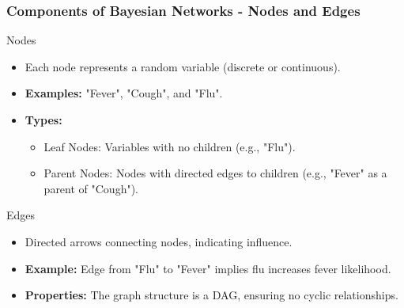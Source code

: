 \documentclass[aspectratio=169]{beamer}
\begin{document}
\begin{frame}[fragile]
    \frametitle{Components of Bayesian Networks - Nodes and Edges}
    \begin{block}{Nodes}
        \begin{itemize}
            \item Each node represents a random variable (discrete or continuous).
            \item \textbf{Examples:} "Fever", "Cough", and "Flu".
            \item \textbf{Types:}
            \begin{itemize}
                \item Leaf Nodes: Variables with no children (e.g., "Flu").
                \item Parent Nodes: Nodes with directed edges to children (e.g., "Fever" as a parent of "Cough").
            \end{itemize}
        \end{itemize}
    \end{block}

    \begin{block}{Edges}
        \begin{itemize}
            \item Directed arrows connecting nodes, indicating influence.
            \item \textbf{Example:} Edge from "Flu" to "Fever" implies flu increases fever likelihood.
            \item \textbf{Properties:} The graph structure is a DAG, ensuring no cyclic relationships.
        \end{itemize}
    \end{block}
\end{frame}
\end{document}
